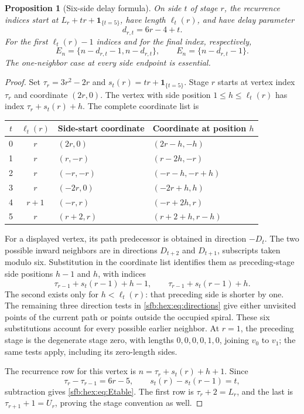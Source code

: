 \documentclass[11pt]{article}
\newtheorem{proposition}[theorem]{Proposition}
\theoremstyle{remark}\newtheorem{remark}[theorem]{Remark}
\newcommand{\one}{\boldsymbol 1}
\begin{document}
\begin{proposition}[Six-side delay formula]\label{sfb:hex:prop:geometry}
On side $t$ of stage $r$, the recurrence indices start at
$L_r+tr+\one_{\{t=5\}}$, have length $\ell_t(r)$, and have delay parameter
\begin{equation}\label{sfb:hex:eq:d}
 d_{r,t}=6r-4+t.
\end{equation}
For the first $\ell_t(r)-1$ indices and for the final index, respectively,
\begin{equation}\label{sfb:hex:eq:Etable}
 E_n=\{n-d_{r,t}-1,n-d_{r,t}\},\qquad
 E_n=\{n-d_{r,t}-1\}.
\end{equation}
The one-neighbor case at every side endpoint is essential.
\end{proposition}
\begin{proof}
Set $\tau_r=3r^2-2r$ and $s_t(r)=tr+\one_{\{t=5\}}$. Stage $r$ starts at vertex index $\tau_r$ and coordinate $(2r,0)$. The vertex with side position $1\le h\le\ell_t(r)$ has index $\tau_r+s_t(r)+h$. The complete coordinate list is
\begin{center}
\begin{tabular}{ccll}
\toprule
$t$ & $\ell_t(r)$ & Side-start coordinate & Coordinate at position $h$\\
\midrule
0 & $r$ & $(2r,0)$ & $(2r-h,-h)$\\
1 & $r$ & $(r,-r)$ & $(r-2h,-r)$\\
2 & $r$ & $(-r,-r)$ & $(-r-h,-r+h)$\\
3 & $r$ & $(-2r,0)$ & $(-2r+h,h)$\\
4 & $r+1$ & $(-r,r)$ & $(-r+2h,r)$\\
5 & $r$ & $(r+2,r)$ & $(r+2+h,r-h)$\\
\bottomrule
\end{tabular}
\end{center}
For a displayed vertex, its path predecessor is obtained in direction $-D_t$. The two possible inward neighbors are in directions $D_{t+2}$ and $D_{t+1}$, subscripts taken modulo six. Substitution in the coordinate list identifies them as preceding-stage side positions $h-1$ and $h$, with indices
\begin{equation}\label{sfb:hex:eq:innerindices}
 \tau_{r-1}+s_t(r-1)+h-1,\qquad
 \tau_{r-1}+s_t(r-1)+h.
\end{equation}
The second exists only for $h<\ell_t(r)$: that preceding side is shorter by one. The remaining three direction tests in \eqref{sfb:hex:eq:directions} give either unvisited points of the current path or points outside the occupied spiral. These six substitutions account for every possible earlier neighbor. At $r=1$, the preceding stage is the degenerate stage zero, with lengths $0,0,0,0,1,0$, joining $v_0$ to $v_1$; the same tests apply, including its zero-length sides.

The recurrence row for this vertex is $n=\tau_r+s_t(r)+h+1$. Since
\[
 \tau_r-\tau_{r-1}=6r-5,\qquad s_t(r)-s_t(r-1)=t,
\]
subtraction gives \eqref{sfb:hex:eq:Etable}. The first row is $\tau_r+2=L_r$, and the last is $\tau_{r+1}+1=U_r$, proving the stage convention as well.
\end{proof}
\end{document}
